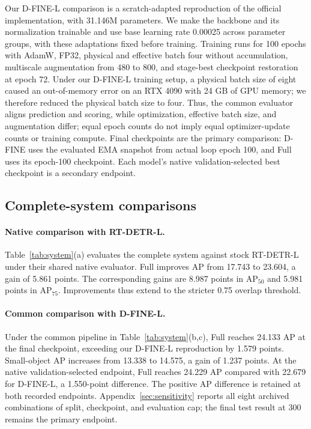 Our D-FINE-L comparison is a scratch-adapted reproduction of the official implementation, with 31.146M parameters. We make the backbone and its normalization trainable and use base learning rate 0.00025 across parameter groups, with these adaptations fixed before training. Training runs for 100 epochs with AdamW, FP32, physical and effective batch four without accumulation, multiscale augmentation from 480 to 800, and stage-best checkpoint restoration at epoch 72. Under our D-FINE-L training setup, a physical batch size of eight caused an out-of-memory error on an RTX 4090 with 24 GB of GPU memory; we therefore reduced the physical batch size to four. Thus, the common evaluator aligns prediction and scoring, while optimization, effective batch size, and augmentation differ; equal epoch counts do not imply equal optimizer-update counts or training compute. Final checkpoints are the primary comparison: D-FINE uses the evaluated EMA snapshot from actual loop epoch 100, and Full uses its epoch-100 checkpoint. Each model's native validation-selected best checkpoint is a secondary endpoint.

\subsection{Complete-system comparisons}\label{sec:systemresults}
\paragraph{Native comparison with RT-DETR-L.}
Table~\ref{tab:system}(a) evaluates the complete system against stock RT-DETR-L under their shared native evaluator. Full improves AP from 17.743 to 23.604, a gain of 5.861 points. The corresponding gains are 8.987 points in $\mathrm{AP}_{50}$ and 5.981 points in $\mathrm{AP}_{75}$. Improvements thus extend to the stricter 0.75 overlap threshold.


\paragraph{Common comparison with D-FINE-L.}
Under the common pipeline in Table~\ref{tab:system}(b,c), Full reaches 24.133 AP at the final checkpoint, exceeding our D-FINE-L reproduction by 1.579 points. Small-object AP increases from 13.338 to 14.575, a gain of 1.237 points. At the native validation-selected endpoint, Full reaches 24.229 AP compared with 22.679 for D-FINE-L, a 1.550-point difference. The positive AP difference is retained at both recorded endpoints. Appendix~\ref{sec:sensitivity} reports all eight archived combinations of split, checkpoint, and evaluation cap; the final test result at 300 remains the primary endpoint.



